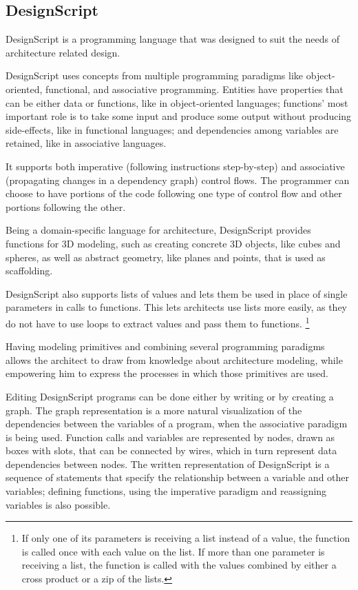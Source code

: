\subsection{DesignScript}
\label{section:designscript:related}
DesignScript\cite{aish2012designscript} is a programming language that was designed to suit the needs of architecture related design.

DesignScript uses concepts from multiple programming paradigms like object-oriented, functional, and associative programming.
Entities have properties that can be either data or functions, like in object-oriented languages; functions' most important role is to take some input and produce some output without producing side-effects, like in functional languages; and dependencies among variables are retained, like in associative languages.

It supports both imperative (following instructions step-by-step) and associative (propagating changes in a dependency graph) control flows.
The programmer can choose to have portions of the code following one type of control flow and other portions following the other.

Being a domain-specific language for architecture, DesignScript provides functions for 3D modeling, such as creating concrete 3D objects, like cubes and spheres, as well as abstract geometry, like planes and points, that is used as scaffolding.

DesignScript also supports lists of values and lets them be used in place of single parameters in calls to functions.
This lets architects use lists more easily, as they do not have to use loops to extract values and pass them to functions.%
\footnote{If only one of its parameters is receiving a list instead of a value, the function is called once with each value on the list.
If more than one parameter is receiving a list, the function is called with the values combined by either a cross product or a zip of the lists.}

Having modeling primitives and combining several programming paradigms allows the architect to draw from knowledge about architecture modeling, while empowering him to express the processes in which those primitives are used.

Editing DesignScript programs can be done either by writing or by creating a graph.
The graph representation is a more natural visualization of the dependencies between the variables of a program, when the associative paradigm is being used.
Function calls and variables are represented by nodes, drawn as boxes with slots, that can be connected by wires, which in turn represent data dependencies between nodes.
The written representation of DesignScript is a sequence of statements that specify the relationship between a variable and other variables; defining functions, using the imperative paradigm and reassigning variables is also possible.


